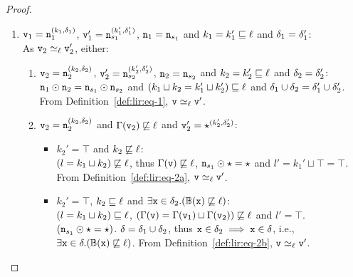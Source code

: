 \begin{proof}
\begin{itemize}[leftmargin=.5in]
    \begin{enumerate}
    \item $\texttt{v}_1 = \texttt{n}_1^{(k_1, \delta_1)}$, $\texttt{v}_1' =
      \texttt{n}_{s_1}^{(k_1',\delta_1')}$, $\texttt{n}_1 =\texttt{n}_{s_1}$ and 
      $k_1 = k_1' \sqsubseteq \ell$ and $\delta_1 = \delta_1'$: \\ 
      As $\texttt{v}_2 \simeq_\ell \texttt{v}_2'$, either: 
      
      \begin{enumerate}
      \item $\texttt{v}_2 = \texttt{n}_2^{(k_2, \delta_2)}$, $\texttt{v}_2' = \texttt{n}_{s_2}^{(k_2',\delta_2')}$,
        $\texttt{n}_2 = \texttt{n}_{s_2}$ and $k_2 = k_2' \sqsubseteq \ell$ and
        $\delta_2 = \delta_2'$:\\ 
        $\texttt{n}_1 \odot \texttt{n}_2 = \texttt{n}_{s_1} \odot \texttt{n}_{s_2}$ and 
        $(k_1 \sqcup k_2 = k_1' \sqcup k_2') \sqsubseteq \ell$ and
        $\delta_1 \cup \delta_2 = \delta_1' \cup \delta_2'$. From
        Definition~\ref{def:lir:eq-1}, $\texttt{v} \simeq_\ell \texttt{v}'$.
        
      \item $\texttt{v}_2 = \texttt{n}_2^{(k_2, \delta_2)}$ and $\Gamma(\texttt{v}_2) \not\sqsubseteq
        \ell$ and  $\texttt{v}_2' = \star^{(k_2',\delta_2')}$:
        
        \begin{itemize}
        \item $k_2' = \top$ and $k_2 \not\sqsubseteq \ell$: \\
          $(l = k_1 \sqcup k_2) \not\sqsubseteq \ell$, thus
          $\Gamma(\texttt{v}) \not\sqsubseteq \ell$, $\texttt{n}_{s_1} \odot \star =
          \star$ and $l' = k_1' \sqcup \top = \top$. From
          Definition~\ref{def:lir:eq-2a}, $\texttt{v} \simeq_\ell \texttt{v}'$. 
          
        \item $k_2' = \top$, $k_2\sqsubseteq \ell$ and $\exists \texttt{x}
          \in \delta_2. (\mathbb{B}(\texttt{x}) \not\sqsubseteq \ell)$: \\
          $(l = k_1 \sqcup k_2) \sqsubseteq \ell$, 
          $(\Gamma(\texttt{v}) = \Gamma(\texttt{v}_1) \sqcup \Gamma(\texttt{v}_2) ) 
          \not\sqsubseteq \ell$ and $l' = \top$. $(\texttt{n}_{s_1} \odot
          \star = \star)$. $\delta = \delta_1 \cup \delta_2$, thus
          $\texttt{x} \in \delta_2 \implies \texttt{x} \in \delta$, i.e., $\exists \texttt{x} \in
          \delta.(\mathbb{B}(\texttt{x}) \not\sqsubseteq \ell)$. From
          Definition~\ref{def:lir:eq-2b}, $\texttt{v} \simeq_\ell \texttt{v}'$. 
          

\end{itemize}
\end{enumerate}
\end{enumerate}
\end{itemize}
\end{proof}
